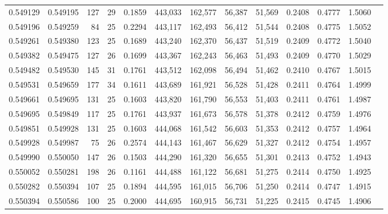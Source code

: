 \begin{tabular}{rrrrrrrrrrrrr}
0.549129 & 0.549195 & 127 &  29 &                                     0.1859 & 443,033 & 162,577 &  56,387 &  51,569 & 0.2408 & 0.4777 & 1.5060 \\
0.549196 & 0.549259 &  84 &  25 &                                     0.2294 & 443,117 & 162,493 &  56,412 &  51,544 & 0.2408 & 0.4775 & 1.5052 \\
0.549261 & 0.549380 & 123 &  25 &                                     0.1689 & 443,240 & 162,370 &  56,437 &  51,519 & 0.2409 & 0.4772 & 1.5040 \\
0.549382 & 0.549475 & 127 &  26 &                                     0.1699 & 443,367 & 162,243 &  56,463 &  51,493 & 0.2409 & 0.4770 & 1.5029 \\
0.549482 & 0.549530 & 145 &  31 &                                     0.1761 & 443,512 & 162,098 &  56,494 &  51,462 & 0.2410 & 0.4767 & 1.5015 \\
0.549531 & 0.549659 & 177 &  34 &                                     0.1611 & 443,689 & 161,921 &  56,528 &  51,428 & 0.2411 & 0.4764 & 1.4999 \\
0.549661 & 0.549695 & 131 &  25 &                                     0.1603 & 443,820 & 161,790 &  56,553 &  51,403 & 0.2411 & 0.4761 & 1.4987 \\
0.549695 & 0.549849 & 117 &  25 &                                     0.1761 & 443,937 & 161,673 &  56,578 &  51,378 & 0.2412 & 0.4759 & 1.4976 \\
0.549851 & 0.549928 & 131 &  25 &                                     0.1603 & 444,068 & 161,542 &  56,603 &  51,353 & 0.2412 & 0.4757 & 1.4964 \\
0.549928 & 0.549987 &  75 &  26 &                                     0.2574 & 444,143 & 161,467 &  56,629 &  51,327 & 0.2412 & 0.4754 & 1.4957 \\
0.549990 & 0.550050 & 147 &  26 &                                     0.1503 & 444,290 & 161,320 &  56,655 &  51,301 & 0.2413 & 0.4752 & 1.4943 \\
0.550052 & 0.550281 & 198 &  26 &                                     0.1161 & 444,488 & 161,122 &  56,681 &  51,275 & 0.2414 & 0.4750 & 1.4925 \\
0.550282 & 0.550394 & 107 &  25 &                                     0.1894 & 444,595 & 161,015 &  56,706 &  51,250 & 0.2414 & 0.4747 & 1.4915 \\
0.550394 & 0.550586 & 100 &  25 &                                     0.2000 & 444,695 & 160,915 &  56,731 &  51,225 & 0.2415 & 0.4745 & 1.4906 \\

\end{tabular}

